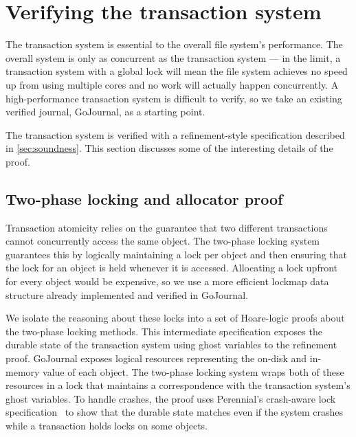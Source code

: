 \section{Verifying the transaction system}
\label{sec:txn-proof}


The transaction system is essential to the overall file system's performance.
The overall system is only as concurrent as the transaction
system --- in the limit, a transaction system with a global lock will mean the
file system achieves no speed up from using multiple cores and no work will
actually happen concurrently. A high-performance transaction system is difficult
to verify, so we take an existing verified journal, GoJournal, as a starting
point.

The transaction system is verified with a refinement-style specification
described in \autoref{sec:soundness}. This section discusses some of the
interesting details of the proof.

\subsection{Two-phase locking and allocator proof}

Transaction atomicity relies on the guarantee that two different transactions
cannot concurrently access the same object. The two-phase locking system
guarantees this by logically maintaining a lock per object and then ensuring
that the lock for an object is held whenever it is accessed. Allocating a lock
upfront for every object would be expensive, so we use a more efficient lockmap
data structure already implemented and verified in GoJournal.

We isolate the reasoning about these locks into a set of Hoare-logic proofs
about the two-phase locking methods. This intermediate specification exposes the
durable state of the transaction system using ghost variables to the refinement
proof.  GoJournal exposes logical resources representing the on-disk and
in-memory value of each object. The two-phase locking system wraps both of these
resources in a lock that maintains a correspondence with the transaction
system's ghost variables. To handle crashes, the proof uses Perennial's
crash-aware lock specification~\citep{chajed:gojournal} to show that the durable
state matches even if the system crashes while a transaction holds locks on some
objects.

